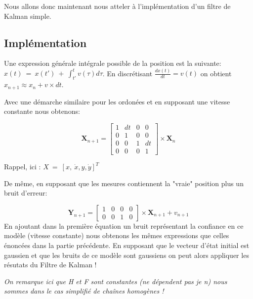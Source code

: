 Nous allons donc maintenant nous atteler à l'implémentation d'un filtre de Kalman simple. 



\subsection{Implémentation}

Une expression générale intégrale possible de la position est la suivante: $\displaystyle x( t) \ =\ x( t') \ +\ \int _{t'}^{t} v( \tau ) d\tau $. En discrétisant $\displaystyle \frac{dx( t)}{dt} =v( t)$ on obtient $\displaystyle x_{n+1} \approx x_{n} +v\times dt$.



Avec une démarche similaire pour les ordonées et en supposant une vitesse constante nous obtenons:


\begin{equation}
	\mathbf{X}_{n+1} =\begin{bmatrix}
		1 & dt & 0 & 0\\
		0 & 1 & 0 & 0\\
		0 & 0 & 1 & dt\\
		0 & 0 & 0 & 1
	\end{bmatrix} \times \mathbf{X}_{n}
\end{equation}


Rappel, ici : $\displaystyle X\ =\ [ x,\ \dot{x} ,y,\dot{y}]^{T}$



De même, en supposant que les mesures contiennent la "vraie" position plus un bruit d'erreur:


\begin{equation}
	\mathbf{Y}_{n+1} =\begin{bmatrix}
		1 & 0 & 0 & 0\\
		0 & 0 & 1 & 0
	\end{bmatrix} \times \mathbf{X}_{n+1} +v_{n+1}
\end{equation}
En ajoutant dans la première équation un bruit représentant la confiance en ce modèle (vitesse constante) nous obtenons les mêmes expressions que celles énoncées dans la partie précédente. En supposant que le vecteur d'état initial est gaussien et que les bruits de ce modèle sont gaussiens on peut alors appliquer les résutats du Filtre de Kalman !



\textit{On remarque ici que H et F sont constantes (ne dépendent pas je n) nous sommes dans le cas simplifié de chaînes homogènes !}

